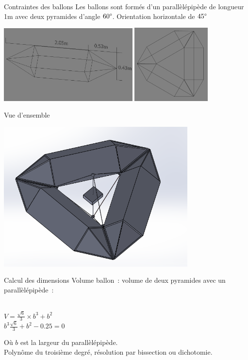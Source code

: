 \begin{frame}{Contraintes des ballons}
  Les ballons sont formés d'un parallèlépipède de longueur 1m avec deux pyramides d'angle $60\degree$. Orientation horizontale de $45\degree$ \\
  \begin{center}
    \includegraphics[width=7cm]{../Images/ballon.png}
    \includegraphics[width=4cm]{../Images/ballon3.png}
  \end{center}
\end{frame}

\begin{frame}{Vue d'ensemble}
 \begin{center}
		\includegraphics[width=10cm]{../Images/structure1_0.PNG}
 \end{center}
\end{frame}

\begin{frame}{Calcul des dimensions}
  Volume ballon~: volume de deux pyramides avec un parallèlépipède~:
  \begin{center}
	 \\
	$\displaystyle{V = \frac{\sqrt{6}}{3} \times b^3 + b^2 }$ \\
	$\displaystyle{b^3 \frac{\sqrt{6}}{3} + b^2 - 0.25 = 0}$
  \end{center}
  Où $b$ est la largeur du parallèlépipède. \\
  Polynôme du troisième degré, résolution par bissection ou dichotomie.
\end{frame}

